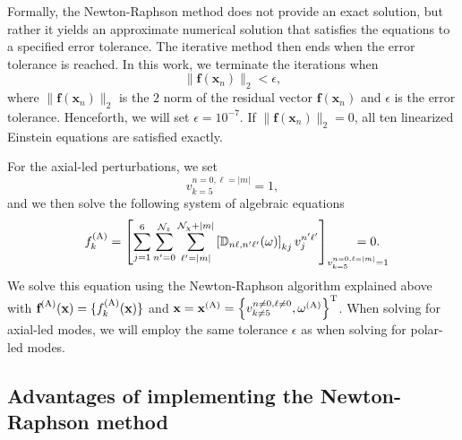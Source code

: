 \documentclass[aps,prx,amsmath,floats,floatfix,twocolumn,
  superscriptaddress,nofootinbib,showpacs]{revtex4-1}
\begin{document}
Formally, the Newton-Raphson method does not provide an exact solution, but rather it yields an approximate numerical solution that satisfies the equations to a specified error tolerance. The iterative method then ends when the error tolerance is reached. In this work, we terminate the iterations when
\begin{equation}\label{eq:tolerance_error}
\| \textbf{f}(\textbf{x}_{n}) \|_{2} < \epsilon, 
\end{equation}
where $ \| \textbf{f}(\textbf{x}_{n}) \|_{2} $ is the $2$ norm of the residual vector $\textbf{f}(\textbf{x}_{n})$ and $\epsilon$ is the error tolerance. 
Henceforth, we will set $\epsilon = 10^{-7}$.
If $\| \textbf{f}(\textbf{x}_{n}) \|_{2} = 0$, all ten linearized Einstein equations are satisfied exactly. 

For the axial-led perturbations, we set
\begin{equation}\label{eq:axial_convention}
v_{k=5}^{n=0,\ell=|m|} = 1,
\end{equation}
and we then solve the following system of algebraic equations
\begin{equation} \label{eq:vector_equations_w_axial_convention}
f^{\rm (A)}_k = \left[ \sum_{j=1}^{6} \sum_{n'=0}^{\mathcal{N}_z} \sum_{\ell'=|m|}^{\mathcal{N}_{\chi}+|m|} \left[ \mathbb{D}_{n \ell, n' \ell'}(\omega) \right]_{kj} v_j^{n' \ell'} \right]_{v_{k=5}^{n=0,\ell=|m|} = 1} \hspace{-1cm}= 0.
\end{equation}
We solve this equation using the Newton-Raphson algorithm explained above with $\textbf{f}^{\rm (A)} (\textbf{x}) = \{ f_{k}^{\rm (A)} (\textbf{x}) \}$ and $\textbf{x} = \textbf{x}^{\rm (A)} = \left\{ v^{n \neq 0, \ell \neq 0}_{k\neq 5}, \omega^{\rm (A)} \right\}^{\rm T}$.
When solving for axial-led modes, we will employ the same tolerance $\epsilon$ as when solving for polar-led modes.

\subsection{Advantages of implementing the Newton-Raphson method}
\end{document}
